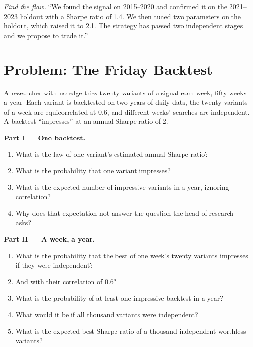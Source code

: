 \begin{exercise}[$\star\star\star$]\label{exo:rs:the-research-process:8}
\emph{Find the flaw.} ``We found the signal on 2015--2020 and confirmed it on the 2021--2023 holdout with a Sharpe ratio of 1.4.
We then tuned two parameters on the holdout, which raised it to 2.1. The strategy has passed two independent stages and we
propose to trade it.''
\end{exercise}

\section{Problem: The Friday Backtest}

\begin{problem}\label{pb:rs:the-research-process:1}
A researcher with no edge tries twenty variants of a signal each week, fifty weeks a year. Each variant is backtested on two
years of daily data, the twenty variants of a week are equicorrelated at 0.6, and different weeks' searches are independent. A
backtest ``impresses'' at an annual Sharpe ratio of 2.

\medskip\noindent\textbf{Part I --- One backtest.}
\begin{enumerate}
\item What is the law of one variant's estimated annual Sharpe ratio?
\item What is the probability that one variant impresses?
\item What is the expected number of impressive variants in a year, ignoring correlation?
\item Why does that expectation not answer the question the head of research asks?
\end{enumerate}

\medskip\noindent\textbf{Part II --- A week, a year.}
\begin{enumerate}[resume]
\item What is the probability that the best of one week's twenty variants impresses if they were independent?
\item And with their correlation of 0.6?
\item What is the probability of at least one impressive backtest in a year?
\item What would it be if all thousand variants were independent?
\item What is the expected best Sharpe ratio of a thousand independent worthless variants?
\end{enumerate}


\end{problem}

